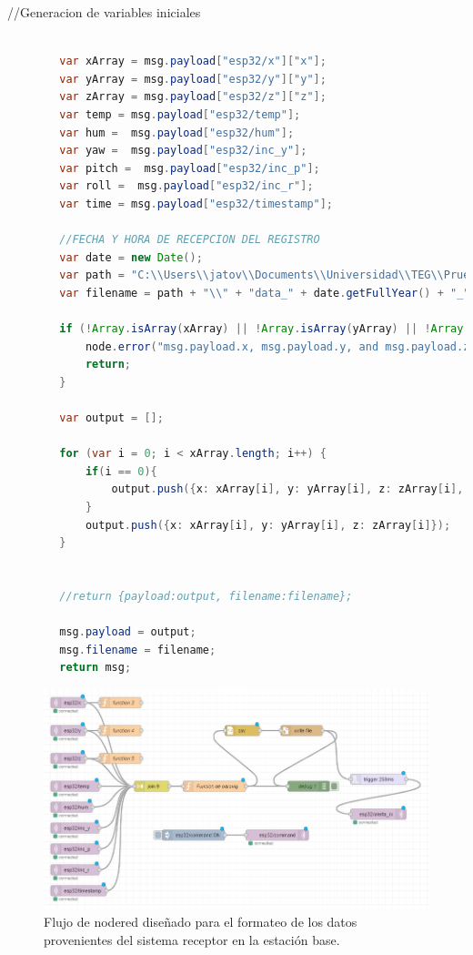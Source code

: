     //Generacion de variables iniciales
    \begin{lstlisting}[language=java, caption=Programa de procesamiento para generación de archivos .csv en NodeRED]
        
        var xArray = msg.payload["esp32/x"]["x"];
        var yArray = msg.payload["esp32/y"]["y"];
        var zArray = msg.payload["esp32/z"]["z"];
        var temp = msg.payload["esp32/temp"];
        var hum =  msg.payload["esp32/hum"];
        var yaw =  msg.payload["esp32/inc_y"];
        var pitch =  msg.payload["esp32/inc_p"];
        var roll =  msg.payload["esp32/inc_r"];
        var time = msg.payload["esp32/timestamp"];
        
        //FECHA Y HORA DE RECEPCION DEL REGISTRO
        var date = new Date();
        var path = "C:\\Users\\jatov\\Documents\\Universidad\\TEG\\Pruebas_DatosAceleracion\\DatosACL_P1";
        var filename = path + "\\" + "data_" + date.getFullYear() + "_" + (date.getMonth()+1) + "_" + date.getDate() + "_" + date.getHours() + "_" + date.getMinutes() + "_" + date.getSeconds() + ".csv";
        
        if (!Array.isArray(xArray) || !Array.isArray(yArray) || !Array.isArray(zArray)) {
            node.error("msg.payload.x, msg.payload.y, and msg.payload.z must be arrays");
            return;
        }
        
        var output = [];
        
        for (var i = 0; i < xArray.length; i++) {
            if(i == 0){
                output.push({x: xArray[i], y: yArray[i], z: zArray[i], temp: temp, hum: hum, yaw: yaw, pitch: pitch, roll: roll, time: time});
            }
            output.push({x: xArray[i], y: yArray[i], z: zArray[i]});
        }
        
        
        //return {payload:output, filename:filename};
        
        msg.payload = output;
        msg.filename = filename;
        return msg;

\end{lstlisting}

\begin{figure}[H]
    \centering
    \includegraphics[width = \textwidth]{imagenes/cap3_resultados/Anexos/FlujoNodeRED.jpg}
    \caption{Flujo de nodered diseñado para el formateo de los datos provenientes del sistema receptor en la estación base.}
    \label{fig:flujonodered}
\end{figure}